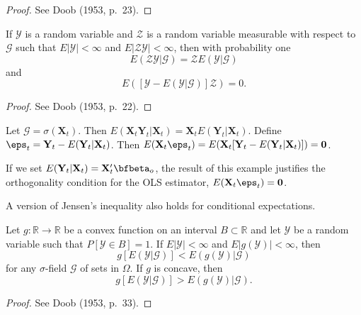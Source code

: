 \begin{proof}
See Doob (1953, p.~23). \qedhere
\end{proof}

\begin{proposition}\label{prop:cond-exp-product}
If $\mathcal{Y}$ is a random variable and $\mathcal{Z}$ is a random variable measurable with respect to $\mathcal{G}$ such that $E|\mathcal{Y}| < \infty$ and $E|\mathcal{Z}\mathcal{Y}| < \infty$, then with probability one
\[
E(\mathcal{Z}\mathcal{Y}|\mathcal{G}) = \mathcal{Z} E(\mathcal{Y}|\mathcal{G})
\]
and
\[
E([\mathcal{Y} - E(\mathcal{Y}|\mathcal{G})]\mathcal{Z}) = 0.
\]
\end{proposition}

\begin{proof}
See Doob (1953, p.~22). \qedhere
\end{proof}

\begin{example}\label{ex:cond-exp-ols}
Let $\mathcal{G} = \sigma(\mathbf{X}_t)$. Then $E(\mathbf{X}_t \mathbf{Y}_t | \mathbf{X}_t) = \mathbf{X}_t E(\mathbf{Y}_t | \mathbf{X}_t)$. Define $\eps_t = \mathbf{Y}_t - E(\mathbf{Y}_t | \mathbf{X}_t)$. Then $E(\mathbf{X}_t \eps_t) = E(\mathbf{X}_t [\mathbf{Y}_t - E(\mathbf{Y}_t | \mathbf{X}_t)]) = \mathbf{0}$.
\end{example}

If we set $E(\mathbf{Y}_t | \mathbf{X}_t) = \mathbf{X}_t' \bfbeta_o$, the result of this example justifies the orthogonality condition for the OLS estimator, $E(\mathbf{X}_t \eps_t) = \mathbf{0}$.

A version of Jensen's inequality also holds for conditional expectations.

\begin{proposition}\label{prop:cond-jensen}
Let $g : \mathbb{R} \to \mathbb{R}$ be a convex function on an interval $B \subset \mathbb{R}$ and let $\mathcal{Y}$ be a random variable such that $P[\mathcal{Y} \in B] = 1$. If $E|\mathcal{Y}| < \infty$ and $E|g(\mathcal{Y})| < \infty$, then
\[
g[E(\mathcal{Y}|\mathcal{G})] < E(g(\mathcal{Y})|\mathcal{G})
\]
for any $\sigma$-field $\mathcal{G}$ of sets in $\Omega$. If $g$ is concave, then
\[
g[E(\mathcal{Y}|\mathcal{G})] > E(g(\mathcal{Y})|\mathcal{G}).
\]
\end{proposition}

\begin{proof}
See Doob (1953, p.~33). \qedhere
\end{proof}

